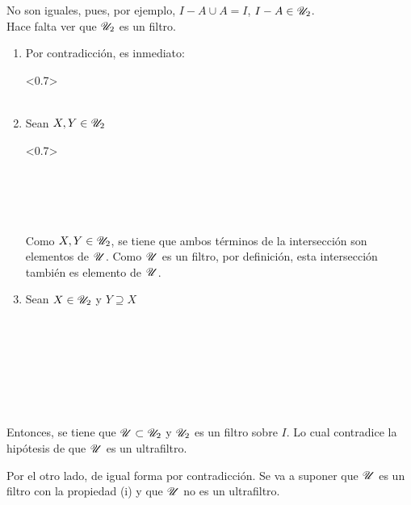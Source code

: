 \begin{demo}[i]
  No son iguales, pues, por ejemplo, $I-A \cup A = I$, $I-A \in \mathscr{U}_2$.\\
  Hace falta ver que $\mathscr{U}_2$ es un filtro.
  \begin{enumerate}
    \item Por contradicción, es inmediato:
          \begin{longderivation}<0.7>
              \\
            \equiv\\
          \end{longderivation}
    \item Sean $X, Y \in \mathscr{U}_2$
          \begin{longderivation}<0.7>
              \\
            \equiv\\
              \\
            \equiv\\
              \\
          \end{longderivation}
          Como $X,Y\in\mathscr{U}_2$, se tiene que ambos términos de la intersección
          son elementos de $\mathscr{U}$. Como $\mathscr{U}$ es un filtro, por definición, esta
          intersección también es elemento de $\mathscr{U}$.
    \item Sean $X\in\mathscr{U}_2$ y $Y\supseteq X$
          \begin{longderivation}
              \\
            \To\\
              \\
            \\
              \\
            \equiv\\
          \end{longderivation}
  \end{enumerate}

  Entonces, se tiene que $\mathscr{U} \subset \mathscr{U}_2$ y $\mathscr{U}_2$ es un filtro sobre
  $I$. Lo cual contradice la hipótesis de que $\mathscr{U}$ es un ultrafiltro.

  Por el otro lado, de igual forma por contradicción. Se va a suponer que
  $\mathscr{U}$ es un filtro con la propiedad (i) y que $\mathscr{U}$ no es un ultrafiltro.


\end{demo}
